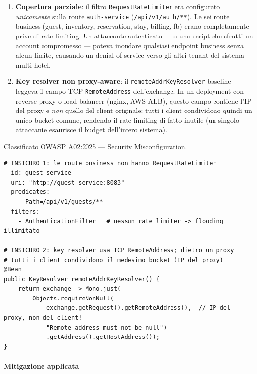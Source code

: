 ﻿\documentclass[a4paper,12pt]{report}
\begin{document}
\begin{enumerate}
  \item \textbf{Copertura parziale}: il filtro \texttt{RequestRateLimiter} era configurato
        \emph{unicamente} sulla route \texttt{auth-service} (\texttt{/api/v1/auth/**}).
        Le sei route business (guest, inventory, reservation, stay, billing, fb) erano
        completamente prive di rate limiting.
        Un attaccante autenticato — o uno script che sfrutti un account compromesso —
        poteva inondare qualsiasi endpoint business senza alcun limite, causando un
        denial-of-service verso gli altri tenant del sistema multi-hotel.

  \item \textbf{Key resolver non proxy-aware}: il \texttt{remoteAddrKeyResolver} baseline
        leggeva il campo TCP \texttt{RemoteAddress} dell'exchange.
        In un deployment con reverse proxy o load-balancer (nginx, AWS ALB), questo campo
        contiene l'IP del proxy e \emph{non} quello del client originale: tutti i client
        condividono quindi un unico bucket comune, rendendo il rate limiting di fatto
        inutile (un singolo attaccante esaurisce il budget dell'intero sistema).
\end{enumerate}

Classificato OWASP A02:2025 --- Security Misconfiguration.

\begin{insecurebox}[title={Baseline vulnerabile — rate limiting solo su auth, key resolver non proxy-aware}]
\begin{lstlisting}[style=yaml]
# INSICURO 1: le route business non hanno RequestRateLimiter
- id: guest-service
  uri: "http://guest-service:8083"
  predicates:
    - Path=/api/v1/guests/**
  filters:
    - AuthenticationFilter   # nessun rate limiter -> flooding illimitato

# INSICURO 2: key resolver usa TCP RemoteAddress; dietro un proxy
# tutti i client condividono il medesimo bucket (IP del proxy)
@Bean
public KeyResolver remoteAddrKeyResolver() {
    return exchange -> Mono.just(
        Objects.requireNonNull(
            exchange.getRequest().getRemoteAddress(),  // IP del proxy, non del client!
            "Remote address must not be null")
            .getAddress().getHostAddress());
}
\end{lstlisting}
\end{insecurebox}

\paragraph{Mitigazione applicata}
\end{document}
